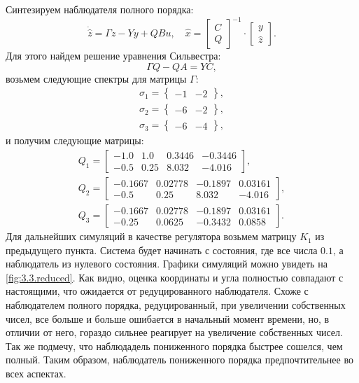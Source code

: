 Синтезируем наблюдателя полного порядка:
\begin{equation}
    \label{eq:3.3.estred}
    \dot{\hat z}=\Gamma z-Yy+QBu,\quad \hat x=\begin{bmatrix}
        C\\Q
    \end{bmatrix}^{-1}\cdot\begin{bmatrix}
        y\\\hat z
    \end{bmatrix}.
\end{equation}
Для этого найдем решение уравнения Сильвестра:
\begin{equation*}
    \Gamma Q-QA=YC,
\end{equation*}
возьмем следующие спектры для матрицы $\Gamma$:
\begin{gather*}
    \sigma_1=\left\{ \begin{array}{cccc}
        -1&-2
    \end{array} \right\},\\
    \sigma_2=\left\{ \begin{array}{cccc}
        -6&-2
    \end{array} \right\},\\
    \sigma_3=\left\{ \begin{array}{cccc}
        -6&-4
    \end{array} \right\},
\end{gather*}
и получим следующие матрицы:
\begin{gather*}
    Q_1=\begin{bmatrix}
-1.0 & 1.0 & 0.3446 & -0.3446\\
-0.5 & 0.25 & 8.032 & -4.016
    \end{bmatrix},\\
    Q_2=\begin{bmatrix}
-0.1667 & 0.02778 & -0.1897 & 0.03161\\
-0.5 & 0.25 & 8.032 & -4.016
    \end{bmatrix},\\
    Q_3=\begin{bmatrix}
-0.1667 & 0.02778 & -0.1897 & 0.03161\\
-0.25 & 0.0625 & -0.3432 & 0.0858
    \end{bmatrix}.
\end{gather*}
Для  дальнейших симуляций в качестве регулятора возьмем матрицу
$K_1$ из предыдущего пункта. 
Система будет начинать с состояния, где все числа $0.1$, а 
наблюдатель из нулевого состояния.
Графики симуляций можно увидеть на 
\autoref{fig:3.3.reduced}. Как видно, оценка координаты и угла полностью совпадают
с настоящими, что ожидается от редуцированного наблюдателя.
Схоже с наблюдателем полного порядка, редуцированный, при увеличении собственных чисел,
все больше и больше ошибается в начальный момент времени, но, в отличии от него,
гораздо сильнее реагирует на увеличение собственных чисел.
Так же подмечу, что наблюдадель пониженного порядка быстрее сошелся, чем полный.
Таким образом, наблюдатель пониженного порядка предпочтительнее во всех аспектах.

